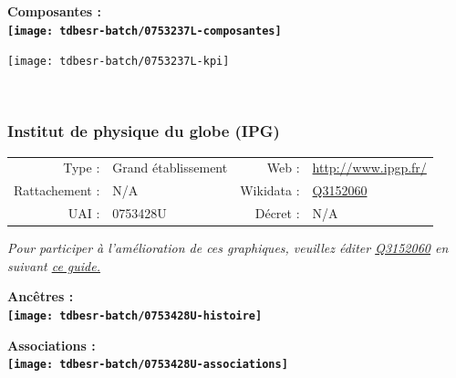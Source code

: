 \documentclass[12pt,french,]{article}
\begin{document}
\hrulefill

\begin{center} \bf Composantes : \\  
\texttt{[image: tdbesr-batch/0753237L-composantes]} \end{center}

\begin{center}\texttt{[image: tdbesr-batch/0753237L-kpi]} \end{center}\checkoddpage

\ifoddpage \fi ~\newpage  

\hypertarget{institut-de-physique-du-globe-ipg}{%
\subsubsection{Institut de physique du globe
(IPG)}\label{institut-de-physique-du-globe-ipg}}

\begin{tabular*}{\textwidth}{rp{5cm}rl}  
\hline  
Type : & Grand établissement & Web : &\href{http://www.ipgp.fr/}{http://www.ipgp.fr/} \\  
Rattachement : & N/A & Wikidata : & \href{https://www.wikidata.org/entity/Q3152060}{Q3152060} \\  
UAI : & 0753428U & Décret : & N/A \\  
\hline  
\end{tabular*}

\textit{\scriptsize Pour participer à l'amélioration de ces graphiques, veuillez éditer  \href{https://www.wikidata.org/entity/Q3152060}{Q3152060}  en suivant \href{https://github.com/cpesr/wikidataESR/blob/master/Rmd/wikidataESR.md}{ce guide.}}

\vspace{1cm}  
\begin{minipage}[b]{0.50\textwidth}\begin{center} \bf Ancêtres : \\  
\texttt{[image: tdbesr-batch/0753428U-histoire]} \end{center}\end{minipage}\begin{minipage}[b]{0.50\textwidth}\begin{center} \bf Associations : \\  
\texttt{[image: tdbesr-batch/0753428U-associations]} \end{center}\end{minipage}

\hrulefill
\end{document}
